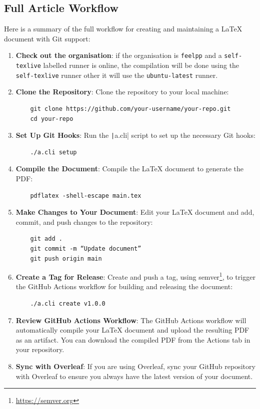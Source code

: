 \documentclass[a4paper]{article}
\begin{document}
\subsection{Full Article Workflow}
\label{sec:full-article-workflow}


Here is a summary of the full workflow for creating and maintaining a LaTeX document with Git support:

\begin{enumerate}
    \item \textbf{Check out the organisation}: if the organisation is \texttt{feelpp} and a \texttt{self-texlive} labelled runner is online, the compilation will be done using the \texttt{self-texlive} runner other it will use the \texttt{ubuntu-latest} runner.
    \item \textbf{Clone the Repository}:
    Clone the repository to your local machine:
    \begin{verbatim}
    git clone https://github.com/your-username/your-repo.git
    cd your-repo
    \end{verbatim}
    \item \textbf{Set Up Git Hooks}:
    Run the \texttt|a.cli| script to set up the necessary Git hooks:
    \begin{verbatim}
    ./a.cli setup
    \end{verbatim}
    \item  \textbf{Compile the Document}:
    Compile the LaTeX document to generate the PDF:
    \begin{verbatim}
    pdflatex -shell-escape main.tex
    \end{verbatim}
    \item \textbf{Make Changes to Your Document}:
    Edit your LaTeX document and add, commit, and push changes to the repository:
    \begin{verbatim}
    git add .
    git commit -m “Update document”
    git push origin main
    \end{verbatim}
    \item \textbf{Create a Tag for Release}:
    Create and push a tag, using semver\footnote{\url{https://semver.org}},  to trigger the GitHub Actions workflow for building and releasing the document:
    \begin{verbatim}
    ./a.cli create v1.0.0
    \end{verbatim}
    \item \textbf{Review GitHub Actions Workflow}:
    The GitHub Actions workflow will automatically compile your LaTeX document and upload the resulting PDF as an artifact. 
    You can download the compiled PDF from the Actions tab in your repository.
    \item \textbf{Sync with Overleaf}:
    If you are using Overleaf, sync your GitHub repository with Overleaf to ensure you always have the latest version of your document.
\end{enumerate}
\end{document}
